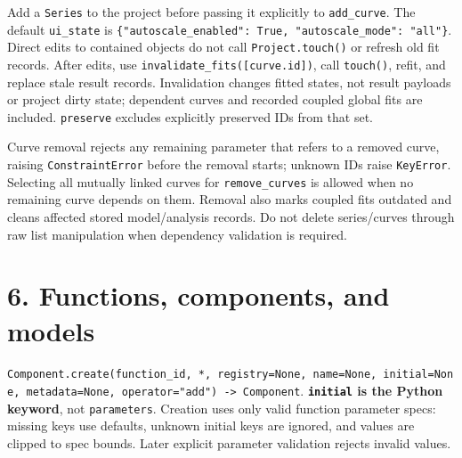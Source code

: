 \documentclass[
  10pt,
  a4paper,
  oneside]{scrreprt}
\begin{document}
Add a \texttt{Series} to the project before passing it explicitly to
\texttt{add\_curve}. The default \texttt{ui\_state} is
\texttt{\{"autoscale\_enabled":\ True,\ "autoscale\_mode":\ "all"\}}.
Direct edits to contained objects do not call \texttt{Project.touch()}
or refresh old fit records. After edits, use
\texttt{invalidate\_fits({[}curve.id{]})}, call \texttt{touch()}, refit,
and replace stale result records. Invalidation changes fitted states,
not result payloads or project dirty state; dependent curves and
recorded coupled global fits are included. \texttt{preserve} excludes
explicitly preserved IDs from that set.

Curve removal rejects any remaining parameter that refers to a removed
curve, raising \texttt{ConstraintError} before the removal starts;
unknown IDs raise \texttt{KeyError}. Selecting all mutually linked
curves for \texttt{remove\_curves} is allowed when no remaining curve
depends on them. Removal also marks coupled fits outdated and cleans
affected stored model/analysis records. Do not delete series/curves
through raw list manipulation when dependency validation is required.

\hypertarget{functions-components-and-models}{%
\section{6. Functions, components, and
models}\label{functions-components-and-models}}

\texttt{Component.create(function\_id,\ *,\ registry=None,\ name=None,\ initial=None,\ metadata=None,\ operator="add")\ -\textgreater{}\ Component}.
\textbf{\texttt{initial} is the Python keyword}, not
\texttt{parameters}. Creation uses only valid function parameter specs:
missing keys use defaults, unknown initial keys are ignored, and values
are clipped to spec bounds. Later explicit parameter validation rejects
invalid values.
\end{document}
